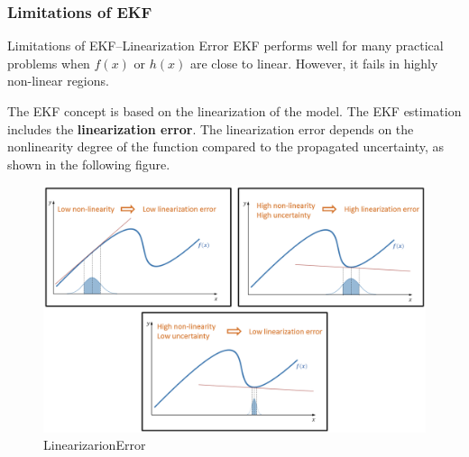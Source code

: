\subsubsection{Limitations of EKF}
\begin{frame}{Limitations of EKF--Linearization Error}
EKF performs well for many practical problems when $f(x)$ or $h(x)$ are close to
linear. However, it fails in highly non-linear regions.
\vspace{5pt}

The EKF concept is based on the linearization of the model. The EKF estimation
includes the \textbf{linearization error}. The linearization error depends on the nonlinearity
degree of the function compared to the propagated uncertainty, as shown in
the following figure.
\begin{figure}
    \centering
    \includegraphics[width=0.7\linewidth]{Figures//Part3/LinearizarionError.png}
    \vspace{-10pt}
    \caption{LinearizarionError}
\end{figure}
\end{frame}


